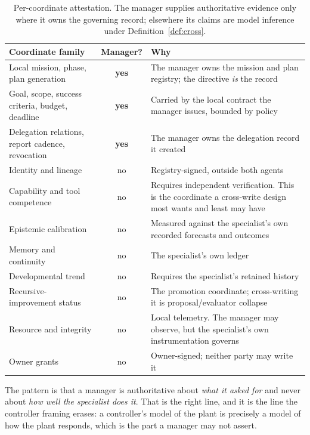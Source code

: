 \documentclass[11pt]{article}
\begin{document}
\begin{table}[h]
\centering\small
\caption{Per-coordinate attestation. The manager supplies authoritative evidence only where it owns the governing record; elsewhere its claims are model inference under Definition~\ref{def:cross}.}
\label{tab:attest}
\begin{tabular}{@{}L{3.4cm}cL{8.3cm}@{}}
\toprule
\textbf{Coordinate family} & \textbf{Manager?} & \textbf{Why} \\
\midrule
Local mission, phase, plan generation & \textbf{yes} & The manager owns the mission and plan registry; the directive \emph{is} the record \\
Goal, scope, success criteria, budget, deadline & \textbf{yes} & Carried by the local contract the manager issues, bounded by policy \\
Delegation relations, report cadence, revocation & \textbf{yes} & The manager owns the delegation record it created \\
\midrule
Identity and lineage & no & Registry-signed, outside both agents \\
Capability and tool competence & no & Requires independent verification. This is the coordinate a cross-write design most wants and least may have \\
Epistemic calibration & no & Measured against the specialist's own recorded forecasts and outcomes \\
Memory and continuity & no & The specialist's own ledger \\
Developmental trend & no & Requires the specialist's retained history \\
Recursive-improvement status & no & The promotion coordinate; cross-writing it is proposal/evaluator collapse \\
Resource and integrity & no & Local telemetry. The manager may observe, but the specialist's own instrumentation governs \\
Owner grants & no & Owner-signed; neither party may write it \\
\bottomrule
\end{tabular}
\end{table}

The pattern is that a manager is authoritative about \emph{what it asked for} and never about \emph{how well the specialist does it}. That is the right line, and it is the line the controller framing erases: a controller's model of the plant is precisely a model of how the plant responds, which is the part a manager may not assert.
\end{document}
